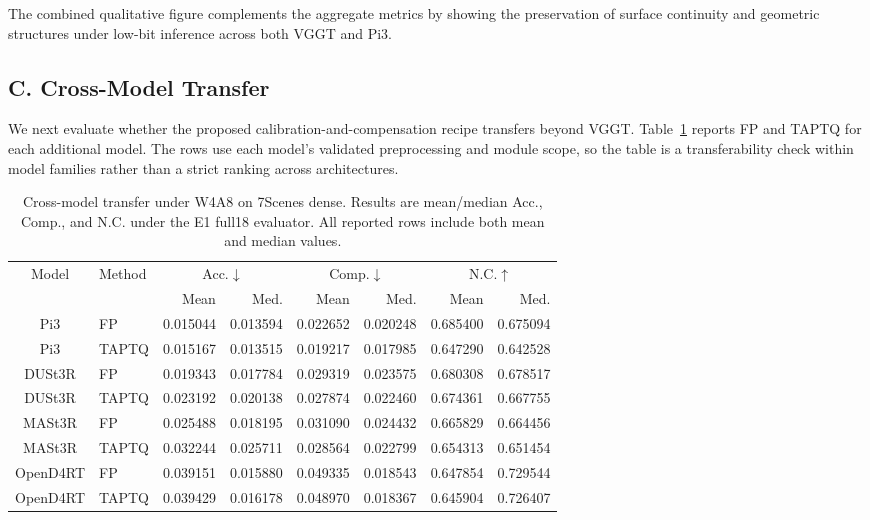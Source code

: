 \documentclass[journal]{Tail_Aware_Post_Training_Quantization_for_3D_Geometry_Models_TMM/IEEEtran}
\newcommand{\taptq}{\textsc{TAPTQ}}
\begin{document}
The combined qualitative figure complements the aggregate metrics by showing the preservation of surface continuity and geometric structures under low-bit inference across both VGGT and Pi3.

\subsection{C. Cross-Model Transfer}

We next evaluate whether the proposed calibration-and-compensation recipe transfers beyond VGGT. Table~\ref{tab:cross_model_transfer} reports FP and \taptq{} for each additional model. The rows use each model's validated preprocessing and module scope, so the table is a transferability check within model families rather than a strict ranking across architectures.

\begin{table}[t]
\caption{Cross-model transfer under W4A8 on 7Scenes dense. Results are mean/median Acc., Comp., and N.C. under the E1 full18 evaluator. All reported rows include both mean and median values.}
\label{tab:cross_model_transfer}
\centering
\scriptsize
\setlength{\tabcolsep}{3pt}
\renewcommand{\arraystretch}{1.05}
\begin{tabular}{@{}clrrrrrr@{}}
\toprule
\multirow{2}{*}{Model} & \multirow{2}{*}{Method}
& \multicolumn{2}{c}{Acc.$\downarrow$}
& \multicolumn{2}{c}{Comp.$\downarrow$}
& \multicolumn{2}{c}{N.C.$\uparrow$} \\
\cmidrule(lr){3-4}
\cmidrule(lr){5-6}
\cmidrule(lr){7-8}
& & Mean & Med. & Mean & Med. & Mean & Med. \\
\midrule
Pi3 & FP & 0.015044 & 0.013594 & 0.022652 & 0.020248 & 0.685400 & 0.675094 \\
Pi3 & \taptq{} & 0.015167 & 0.013515 & 0.019217 & 0.017985 & 0.647290 & 0.642528 \\
\midrule
DUSt3R & FP & 0.019343 & 0.017784 & 0.029319 & 0.023575 & 0.680308 & 0.678517 \\
DUSt3R & \taptq{} & 0.023192 & 0.020138 & 0.027874 & 0.022460 & 0.674361 & 0.667755 \\
\midrule
MASt3R & FP & 0.025488 & 0.018195 & 0.031090 & 0.024432 & 0.665829 & 0.664456 \\
MASt3R & \taptq{} & 0.032244 & 0.025711 & 0.028564 & 0.022799 & 0.654313 & 0.651454 \\
\midrule
OpenD4RT & FP & 0.039151 & 0.015880 & 0.049335 & 0.018543 & 0.647854 & 0.729544 \\
OpenD4RT & \taptq{} & 0.039429 & 0.016178 & 0.048970 & 0.018367 & 0.645904 & 0.726407 \\
\bottomrule
\end{tabular}
\end{table}
\end{document}
